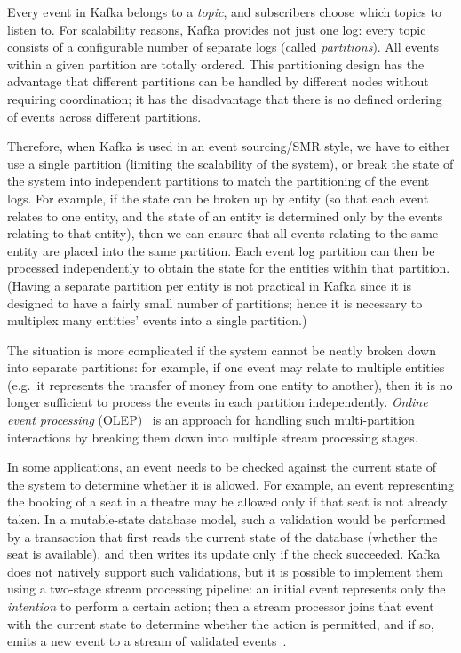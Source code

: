 \documentclass[sigconf]{acmart}
\begin{document}
Every event in Kafka belongs to a \emph{topic}, and subscribers choose which topics to listen to.
For scalability reasons, Kafka provides not just one log: every topic consists of a configurable number of separate logs (called \emph{partitions}).
All events within a given partition are totally ordered.
This partitioning design has the advantage that different partitions can be handled by different nodes without requiring coordination; it has the disadvantage that there is no defined ordering of events across different partitions.

Therefore, when Kafka is used in an event sourcing/SMR style, we have to either use a single partition (limiting the scalability of the system), or break the state of the system into independent partitions to match the partitioning of the event logs.
For example, if the state can be broken up by entity (so that each event relates to one entity, and the state of an entity is determined only by the events relating to that entity), then we can ensure that all events relating to the same entity are placed into the same partition.
Each event log partition can then be processed independently to obtain the state for the entities within that partition.
(Having a separate partition per entity is not practical in Kafka since it is designed to have a fairly small number of partitions; hence it is necessary to multiplex many entities' events into a single partition.)

The situation is more complicated if the system cannot be neatly broken down into separate partitions: for example, if one event may relate to multiple entities (e.g.\ it represents the transfer of money from one entity to another), then it is no longer sufficient to process the events in each partition independently.
\emph{Online event processing} (OLEP)~\cite{Kleppmann:2019olep} is an approach for handling such multi-partition interactions by breaking them down into multiple stream processing stages.

In some applications, an event needs to be checked against the current state of the system to determine whether it is allowed.
For example, an event representing the booking of a seat in a theatre may be allowed only if that seat is not already taken.
In a mutable-state database model, such a validation would be performed by a transaction that first reads the current state of the database (whether the seat is available), and then writes its update only if the check succeeded.
Kafka does not natively support such validations, but it is possible to implement them using a two-stage stream processing pipeline: an initial event represents only the \emph{intention} to perform a certain action; then a stream processor joins that event with the current state to determine whether the action is permitted, and if so, emits a new event to a stream of validated events~\cite{Kleppmann:2019olep}.
\end{document}
